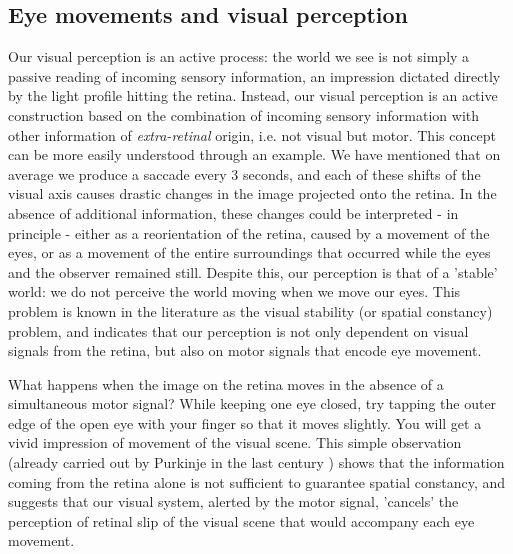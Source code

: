 \documentclass[11pt]{article}
\begin{document}
\subsection{Eye movements and visual perception}
Our visual perception is an active process: the world we see is not simply a passive reading of incoming sensory information, an impression dictated directly by the light profile hitting the retina. Instead, our visual perception is an active construction based on the combination of incoming sensory information with other information of \textit{extra-retinal} origin, i.e. not visual but motor. This concept can be more easily understood through an example. We have mentioned that on average we produce a saccade every 3 seconds, and each of these shifts of the visual axis causes drastic changes in the image projected onto the retina. In the absence of additional information, these changes could be interpreted - in principle - either as a reorientation of the retina, caused by a movement of the eyes, or as a movement of the entire surroundings that occurred while the eyes and the observer remained still. Despite this, our perception is that of a 'stable' world: we do not perceive the world moving when we move our eyes. This problem is known in the literature as the visual stability (or spatial constancy) problem, and indicates that our perception is not only dependent on visual signals from the retina, but also on motor signals that encode eye movement.

What happens when the image on the retina moves in the absence of a simultaneous motor signal? While keeping one eye closed, try tapping the outer edge of the open eye with your finger so that it moves slightly. You will get a vivid impression of movement of the visual scene. This simple observation (already carried out by Purkinje in the last century \cite{Purkinje1825}) shows that the information coming from the retina alone is not sufficient to guarantee spatial constancy, and suggests that our visual system, alerted by the motor signal, 'cancels' the perception of retinal slip of the visual scene that would accompany each eye movement.
\end{document}
